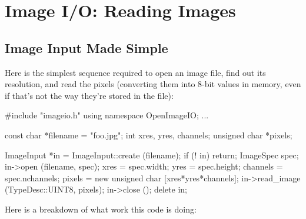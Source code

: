 \chapter{Image I/O: Reading Images}
\label{chap:imageinput}


\section{Image Input Made Simple}
\label{sec:imageinput:simple}

Here is the simplest sequence required to open an image file, find
out its resolution, and read the pixels (converting them into
8-bit values in memory, even if that's not the way they're stored in the file):

\begin{code}
        #include "imageio.h"
        using namespace OpenImageIO;
        ...

        const char *filename = "foo.jpg";
        int xres, yres, channels;
        unsigned char *pixels;

        ImageInput *in = ImageInput::create (filename);
        if (! in)
            return;
        ImageSpec spec;
        in->open (filename, spec);
        xres = spec.width;
        yres = spec.height;
        channels = spec.nchannels;
        pixels = new unsigned char [xres*yres*channels];
        in->read_image (TypeDesc::UINT8, pixels);
        in->close ();
        delete in;
\end{code}

\noindent Here is a breakdown of what work this code is doing:

